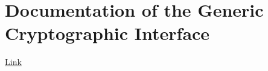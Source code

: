 \appendix

\chapter{Documentation of the Generic Cryptographic Interface}

\href{../doc_GCI/doc_GCI.pdf}{Link}